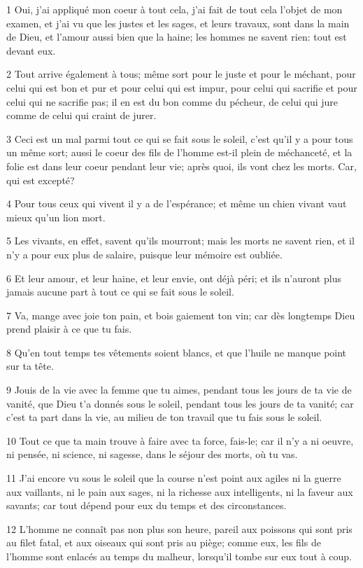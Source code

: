 \par 1 Oui, j'ai appliqué mon coeur à tout cela, j'ai fait de tout cela l'objet de mon examen, et j'ai vu que les justes et les sages, et leurs travaux, sont dans la main de Dieu, et l'amour aussi bien que la haine; les hommes ne savent rien: tout est devant eux.
\par 2 Tout arrive également à tous; même sort pour le juste et pour le méchant, pour celui qui est bon et pur et pour celui qui est impur, pour celui qui sacrifie et pour celui qui ne sacrifie pas; il en est du bon comme du pécheur, de celui qui jure comme de celui qui craint de jurer.
\par 3 Ceci est un mal parmi tout ce qui se fait sous le soleil, c'est qu'il y a pour tous un même sort; aussi le coeur des fils de l'homme est-il plein de méchanceté, et la folie est dans leur coeur pendant leur vie; après quoi, ils vont chez les morts. Car, qui est excepté?
\par 4 Pour tous ceux qui vivent il y a de l'espérance; et même un chien vivant vaut mieux qu'un lion mort.
\par 5 Les vivants, en effet, savent qu'ils mourront; mais les morts ne savent rien, et il n'y a pour eux plus de salaire, puisque leur mémoire est oubliée.
\par 6 Et leur amour, et leur haine, et leur envie, ont déjà péri; et ils n'auront plus jamais aucune part à tout ce qui se fait sous le soleil.
\par 7 Va, mange avec joie ton pain, et bois gaiement ton vin; car dès longtemps Dieu prend plaisir à ce que tu fais.
\par 8 Qu'en tout temps tes vêtements soient blancs, et que l'huile ne manque point sur ta tête.
\par 9 Jouis de la vie avec la femme que tu aimes, pendant tous les jours de ta vie de vanité, que Dieu t'a donnés sous le soleil, pendant tous les jours de ta vanité; car c'est ta part dans la vie, au milieu de ton travail que tu fais sous le soleil.
\par 10 Tout ce que ta main trouve à faire avec ta force, fais-le; car il n'y a ni oeuvre, ni pensée, ni science, ni sagesse, dans le séjour des morts, où tu vas.
\par 11 J'ai encore vu sous le soleil que la course n'est point aux agiles ni la guerre aux vaillants, ni le pain aux sages, ni la richesse aux intelligents, ni la faveur aux savants; car tout dépend pour eux du temps et des circonstances.
\par 12 L'homme ne connaît pas non plus son heure, pareil aux poissons qui sont pris au filet fatal, et aux oiseaux qui sont pris au piège; comme eux, les fils de l'homme sont enlacés au temps du malheur, lorsqu'il tombe sur eux tout à coup.
